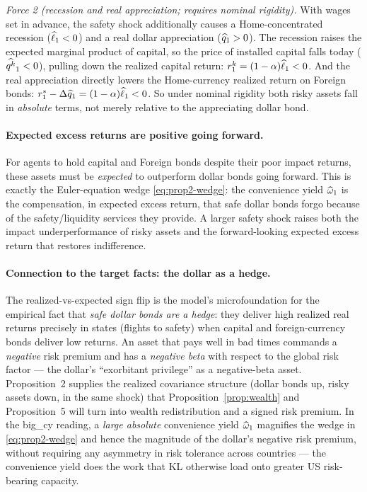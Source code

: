 \emph{Force 2 (recession and real appreciation; requires nominal rigidity).} With
wages set in advance, the safety shock additionally causes a Home-concentrated
recession ($\widehat{\ell}_1<0$) and a real dollar appreciation ($\widehat{q}_1>0$).
The recession raises the expected marginal product of capital, so the price of
installed capital falls today ($\widehat{q^{k}}_1<0$), pulling down the realized
capital return: $r^{k}_1=(1-\alpha)\widehat{\ell}_1<0$. And the real appreciation
directly lowers the Home-currency realized return on Foreign bonds:
$r^{*}_1-\Delta\widehat{q}_1=(1-\alpha)\widehat{\ell}_1<0$. So under nominal rigidity
both risky assets fall in \emph{absolute} terms, not merely relative to the
appreciating dollar bond.

\paragraph{Expected excess returns are positive going forward.} For agents to
hold capital and Foreign bonds despite their poor impact returns, these assets
must be \emph{expected} to outperform dollar bonds going forward. This is exactly
the Euler-equation wedge \eqref{eq:prop2-wedge}: the convenience yield
$\widehat{\omega}_1$ is the compensation, in expected excess return, that safe dollar
bonds forgo because of the safety/liquidity services they provide. A larger
safety shock raises both the impact underperformance of risky assets and the
forward-looking expected excess return that restores indifference.

\paragraph{Connection to the target facts: the dollar as a hedge.} The
realized-vs-expected sign flip is the model's microfoundation for the empirical
fact that \emph{safe dollar bonds are a hedge}: they deliver high realized real
returns precisely in states (flights to safety) when capital and foreign-currency
bonds deliver low returns. An asset that pays well in bad times commands a
\emph{negative} risk premium and has a \emph{negative beta} with respect to the
global risk factor --- the dollar's ``exorbitant privilege'' as a negative-beta
asset. Proposition~2 supplies the realized covariance structure (dollar bonds up,
risky assets down, in the same shock) that Proposition~\ref{prop:wealth} and
Proposition~5 will turn into wealth redistribution and a signed risk premium. In
the big\_cy reading, a \emph{large absolute} convenience yield $\widehat{\omega}_1$
magnifies the wedge in \eqref{eq:prop2-wedge} and hence the magnitude of the
dollar's negative risk premium, without requiring any asymmetry in risk tolerance
across countries --- the convenience yield does the work that KL otherwise load
onto greater US risk-bearing capacity.
